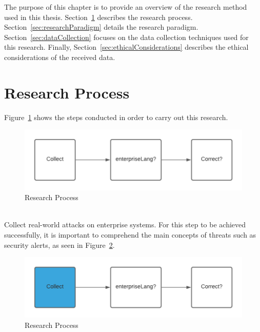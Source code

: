 \documentclass[english]{kththesis}
\begin{document}
The purpose of this chapter is to provide an overview of the research method
used in this thesis. Section~\ref{sec:researchProcess} describes the research
process. Section~\ref{sec:researchParadigm} details the research
paradigm. Section~\ref{sec:dataCollection} focuses on the data collection
techniques used for this research. Finally, Section~\ref{sec:ethicalConsiderations} describes the ethical considerations of the received data.

\section{Research Process}
\label{sec:researchProcess}
Figure~\ref{fig:researchsteps} shows the steps conducted in order to carry out this research. 

 \begin{figure}[!ht]
  \begin{center}
    \includegraphics{researchsteps.png}
  \end{center}
  \caption{Research Process}
  \label{fig:researchsteps}
\end{figure}

\newpage
{}\\

\noindent Collect real-world attacks on enterprise systems. For this step to be achieved successfully, it is important to comprehend the main concepts of threats such as security alerts, as seen in Figure~\ref{fig:researchsteps1}.

\begin{figure}[!ht]
  \begin{center}
    \includegraphics{researchsteps1.png}
  \end{center}
  \caption{Research Process}
  \label{fig:researchsteps1}
\end{figure}
\end{document}
